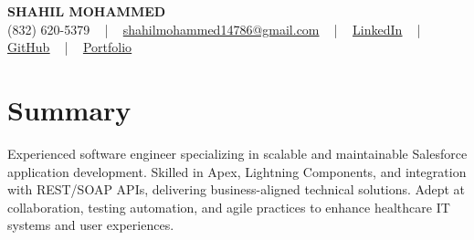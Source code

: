 \documentclass[letterpaper,10pt]{article}
\begin{document}
\begin{center}
    {\fontsize{14pt}{12pt}\selectfont \textbf{\MakeUppercase{Shahil Mohammed}}}\\ \vspace{2pt}
    \fontsize{10pt}{12pt}\selectfont (832) 620-5379 ~ | ~ \href{mailto:shahilmohammed14786@gmail.com}{shahilmohammed14786@gmail.com} ~ | ~  
    \href{https://www.linkedin.com/in/shahil-mohammed-9652931a1/}{\color{blue}\underline{LinkedIn}}  ~ | ~ 
    \href{https://github.com/freakbeast14}{\color{blue}\underline{GitHub}} ~ | ~ 
    \href{https://shahil-mohammed.netlify.app/}{\color{blue}\underline{Portfolio}}
    \vspace{-8pt}
\end{center}

\section{Summary}
\vspace{-2pt}\fontsize{8pt}{9pt}\selectfont
Experienced software engineer specializing in scalable and maintainable Salesforce application development. Skilled in Apex, Lightning Components, and integration with REST/SOAP APIs, delivering business-aligned technical solutions. Adept at collaboration, testing automation, and agile practices to enhance healthcare IT systems and user experiences.
 \vspace{-5pt}
 
\vspace{-2pt}
\end{document}
